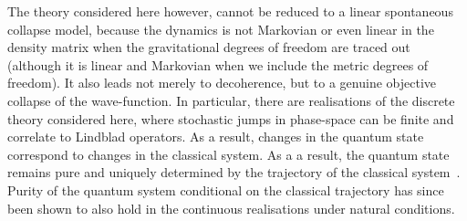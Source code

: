 \documentclass[aps,pra,showpacs,citeautoscript,amsmath,amssymb,floatfix,superscriptaddress,bbm, verbatim,amsfonts,changes,10pt,nofootinbib,longbibliography]{revtex4-1}
\begin{document}
The theory considered here however, cannot be reduced to a linear spontaneous collapse model, because the dynamics is not Markovian or even linear in the density matrix when the gravitational degrees of freedom are traced out (although it is linear and Markovian when we include the metric degrees of freedom). It also leads not merely to decoherence, but
to a genuine objective collapse of the wave-function.
In particular, there are realisations of the discrete theory considered here, where stochastic jumps in phase-space can be finite and correlate to Lindblad operators. As a result, changes in the quantum state correspond to changes in the classical system. As a a result, the quantum state remains pure and uniquely determined by the trajectory of the classical system~\cite{UCLqubit}. Purity of the quantum system conditional on the classical trajectory has since been shown to also hold in the continuous realisations under natural conditions\cite{layton2022semi}. 
\end{document}
